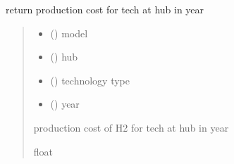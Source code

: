 \documentclass[letterpaper,10pt,english]{sphinxmanual}
\begin{document}
\begin{fulllineitems}
\label{\detokenize{src.models.hydrogen.utilities.h2_functions:src.models.hydrogen.utilities.h2_functions.get_production_cost}}
\pysigstartsignatures
\pysiglinewithargsret
{}
{\sphinxparamcomma {}\sphinxparamcomma {}\sphinxparamcomma {}}
{}
\pysigstopsignatures
\sphinxAtStartPar
return production cost for tech at hub in year
\begin{quote}\begin{description}
\begin{itemize}
\item {} 
\sphinxAtStartPar
{} ({\hyperref[\detokenize{src.models.hydrogen.model.h2_model:src.models.hydrogen.model.h2_model.H2Model}]{}}) \textendash{} model

\item {} 
\sphinxAtStartPar
{} () \textendash{} hub

\item {} 
\sphinxAtStartPar
{} () \textendash{} technology type

\item {} 
\sphinxAtStartPar
{} () \textendash{} year

\end{itemize}

\sphinxAtStartPar
production cost of H2 for tech at hub in year

\sphinxAtStartPar
float

\end{description}\end{quote}

\end{fulllineitems}
\end{document}
